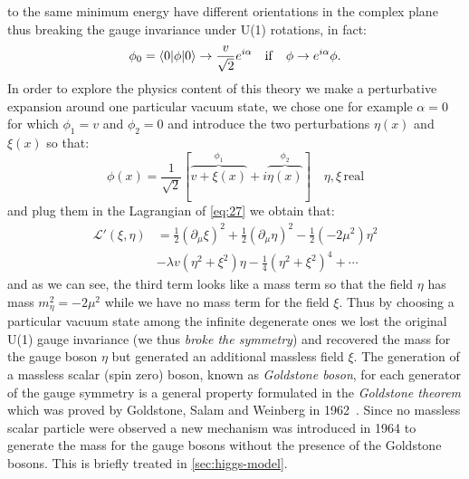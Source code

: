 to the same minimum energy have different orientations in the complex plane thus
breaking the gauge invariance under U(1) rotations, in fact:
\begin{equation}
  \label{eq:29}
  \phi_{0} = \langle 0| \phi |0\rangle \rightarrow \frac{v}{\sqrt{2}} e^{i
    \alpha} \quad \mathrm{if} \quad \phi \rightarrow e^{i \alpha} \phi.
\end{equation}
In order to explore the physics content of this theory we make a perturbative
expansion around one particular vacuum state, we chose one for example
$\alpha = 0$ for which $\phi_{1} = v$ and $\phi_{2} = 0$ and introduce the two
perturbations $\eta(x)$ and $\xi(x)$ so that:
\begin{equation}
  \label{eq:30}
  \phi (x) = \frac{1}{\sqrt{2}} \left[ \overbrace{v + \xi(x)}^{\phi_{1}} + i
    \overbrace{\eta(x)}^{\phi_{2}} \right] \quad \eta,\xi \mathrm{\, real}
\end{equation}
and plug them in the Lagrangian of \cref{eq:27} we obtain that:
\begin{equation}
  \label{eq:31}
  \begin{aligned}
    \mathcal{L}' (\xi,\eta) &= \frac{1}{2}(\partial_{\mu} \xi)^{2} + \frac{1}{2}
    (\partial_{\mu} \eta)^{2} - \frac{1}{2}(-2 \mu^{2})\eta^{2} \\ &- \lambda v
    (\eta^{2} + \xi^{2}) \eta - \frac{1}{4}(\eta^{2} + \xi^{2})^{4} + \cdots
  \end{aligned}
\end{equation}
and as we can see, the third term looks like a mass term so that the field
$\eta$ has mass $m_{\eta}^{2} = -2 \mu^{2}$ while we have no mass term for the
field $\xi$. Thus by choosing a particular vacuum state among the infinite
degenerate ones we lost the original U(1) gauge invariance (we thus \emph{broke
  the symmetry}) and recovered the mass for the gauge boson $\eta$ but generated
an additional massless field $\xi$. The generation of a massless scalar (spin
zero) boson, known as \emph{Goldstone boson}, for each generator of the gauge
symmetry is a general property formulated in the \emph{Goldstone theorem} which
was proved by Goldstone, Salam and Weinberg in 1962~\cite{GoldstoneTheorem}.
Since no massless scalar particle were observed a new mechanism was introduced
in 1964 to generate the mass for the gauge bosons without the presence of the
Goldstone bosons. This is briefly treated in \ref{sec:higgs-model}.

